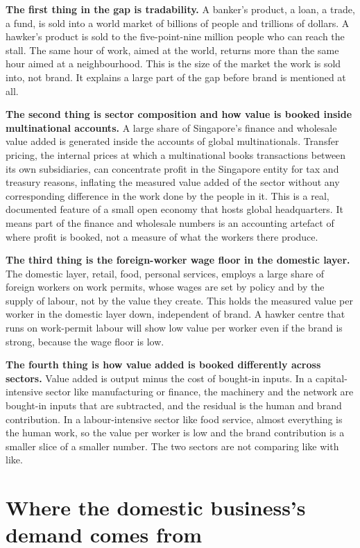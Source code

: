 \documentclass[10pt,twoside,openany]{memoir}
\newcommand{\needspacehead}{\needspace{4\baselineskip}}
\let\oldsection\section
\renewcommand{\section}{\needspacehead\oldsection}
\begin{document}
{{{{\textbf{The first thing in the gap is tradability.} A banker's product,
a loan, a trade, a fund, is sold into a world market of billions of
people and trillions of dollars. A hawker's product is sold to the
five-point-nine million people who can reach the stall. The same hour of
work, aimed at the world, returns more than the same hour aimed at a
neighbourhood. This is the size of the market the work is sold into, not
brand. It explains a large part of the gap before brand is mentioned at
all.

\textbf{The second thing is sector composition and how value is booked
inside multinational accounts.} A large share of Singapore's finance and
wholesale value added is generated inside the accounts of global
multinationals. Transfer pricing, the internal prices at which a
multinational books transactions between its own subsidiaries, can
concentrate profit in the Singapore entity for tax and treasury reasons,
inflating the measured value added of the sector without any
corresponding difference in the work done by the people in it. This is a
real, documented feature of a small open economy that hosts global
headquarters. It means part of the finance and wholesale numbers is an
accounting artefact of where profit is booked, not a measure of what the
workers there produce.

\textbf{The third thing is the foreign-worker wage floor in the domestic
layer.} The domestic layer, retail, food, personal services, employs a
large share of foreign workers on work permits, whose wages are set by
policy and by the supply of labour, not by the value they create. This
holds the measured value per worker in the domestic layer down,
independent of brand. A hawker centre that runs on work-permit labour
will show low value per worker even if the brand is strong, because the
wage floor is low.

\textbf{The fourth thing is how value added is booked differently across
sectors.} Value added is output minus the cost of bought-in inputs. In a
capital-intensive sector like manufacturing or finance, the machinery
and the network are bought-in inputs that are subtracted, and the
residual is the human and brand contribution. In a labour-intensive
sector like food service, almost everything is the human work, so the
value per worker is low and the brand contribution is a smaller slice of
a smaller number. The two sectors are not comparing like with like.

\section{Where the domestic business's demand comes
from}\label{where-the-domestic-businesss-demand-comes-from}

}}}}
\end{document}
